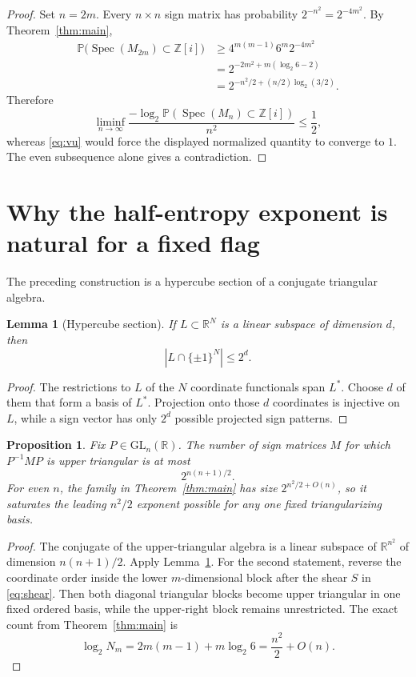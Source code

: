 \documentclass[11pt]{article}
\newtheorem{proposition}{Proposition}
\newtheorem{lemma}{Lemma}
\begin{document}
\begin{proof}
Set $n=2m$.  Every $n\times n$ sign matrix has probability $2^{-n^2}=2^{-4m^2}$.  By Theorem~\ref{thm:main},
\begin{align*}
\mathbb P\bigl(\operatorname{Spec}(M_{2m})\subset\mathbb Z[i]\bigr)
&\ge 4^{m(m-1)}6^m2^{-4m^2}\\
&=2^{-2m^2+m(\log_2 6-2)}\\
&=2^{-n^2/2+(n/2)\log_2(3/2)}.
\end{align*}
Therefore
\[
\liminf_{n\to\infty}
\frac{-\log_2\mathbb P(\operatorname{Spec}(M_n)\subset\mathbb Z[i])}{n^2}
\le \frac12,
\]
whereas \eqref{eq:vu} would force the displayed normalized quantity to converge to $1$.  The even subsequence alone gives a contradiction.
\end{proof}

\section{Why the half-entropy exponent is natural for a fixed flag}
The preceding construction is a hypercube section of a conjugate triangular algebra.

\begin{lemma}[Hypercube section]\label{lem:cube}
If $L\subset\mathbb R^N$ is a linear subspace of dimension $d$, then
\[
|L\cap\{\pm1\}^N|\le2^d.
\]
\end{lemma}

\begin{proof}
The restrictions to $L$ of the $N$ coordinate functionals span $L^*$. Choose $d$ of them that form a basis of $L^*$. Projection onto those $d$ coordinates is injective on $L$, while a sign vector has only $2^d$ possible projected sign patterns.
\end{proof}

\begin{proposition}\label{prop:flag}
Fix $P\in\mathrm{GL}_n(\mathbb R)$.  The number of sign matrices $M$ for which $P^{-1}MP$ is upper triangular is at most
\[
2^{n(n+1)/2}.
\]
For even $n$, the family in Theorem~\ref{thm:main} has size $2^{n^2/2+O(n)}$, so it saturates the leading $n^2/2$ exponent possible for any one fixed triangularizing basis.
\end{proposition}

\begin{proof}
The conjugate of the upper-triangular algebra is a linear subspace of $\mathbb R^{n^2}$ of dimension $n(n+1)/2$.  Apply Lemma~\ref{lem:cube}.  For the second statement, reverse the coordinate order inside the lower $m$-dimensional block after the shear $S$ in \eqref{eq:shear}.  Then both diagonal triangular blocks become upper triangular in one fixed ordered basis, while the upper-right block remains unrestricted.  The exact count from Theorem~\ref{thm:main} is
\[
\log_2 N_m=2m(m-1)+m\log_2 6=\frac{n^2}{2}+O(n).
\]
\end{proof}
\end{document}
